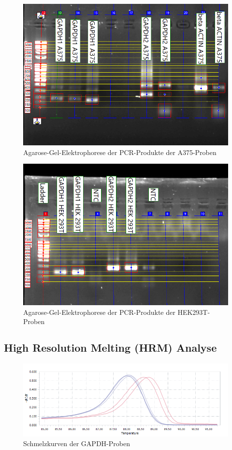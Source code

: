 \documentclass{article}
\begin{document}
\begin{figure}[H]
    \centering
    \includegraphics[width=\textwidth]{images/gel/a375bp.png}
    \caption{Agarose-Gel-Elektrophorese der PCR-Produkte der A375-Proben}
    \label{fig:gela375}
\end{figure}
\begin{figure}[H]
    \centering
    \includegraphics[width=\textwidth]{images/gel/hek293T.png}
    \caption{Agarose-Gel-Elektrophorese der PCR-Produkte der HEK293T-Proben}
    \label{fig:gela375}
\end{figure}

\subsection*{High Resolution Melting (HRM) Analyse}
\begin{figure}[H]
    \centering
    \includegraphics[width=\textwidth]{images/cycler/bactinmelting.png}
    \caption{Schmelzkurven der GAPDH-Proben}
    \label{fig:gapdh}
\end{figure}
\end{document}
